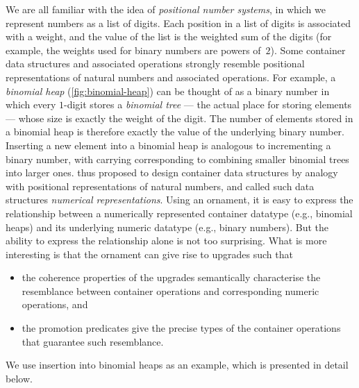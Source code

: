 We are all familiar with the idea of \emph{positional number systems}, in which we represent numbers as a list of digits.
Each position in a list of digits is associated with a weight, and the value of the list is the weighted sum of the digits (for example, the weights used for binary numbers are powers of~$2$).
Some container data structures and associated operations strongly resemble positional representations of natural numbers and associated operations.
For example, a \emph{binomial heap} (\autoref{fig:binomial-heap}) can be thought of as a binary number in which every $1$-digit stores a \emph{binomial tree} --- the actual place for storing elements --- whose size is exactly the weight of the digit.
The number of elements stored in a binomial heap is therefore exactly the value of the underlying binary number.
Inserting a new element into a binomial heap is analogous to incrementing a binary number, with carrying corresponding to combining smaller binomial trees into larger ones.
\citeauthor{Okasaki-data-structures} thus proposed to design container data structures by analogy with positional representations of natural numbers, and called such data structures \emph{numerical representations}.
Using an ornament, it is easy to express the relationship between a numerically represented container datatype (e.g., binomial heaps) and its underlying numeric datatype (e.g., binary numbers).
But the ability to express the relationship alone is not too surprising.
What is more interesting is that the ornament can give rise to upgrades such that
\begin{itemize}
\item the coherence properties of the upgrades semantically characterise the resemblance between container operations and corresponding numeric operations, and
\item the promotion predicates give the precise types of the container operations that guarantee such resemblance.
\end{itemize}
We use insertion into binomial heaps as an example, which is presented in detail below.

